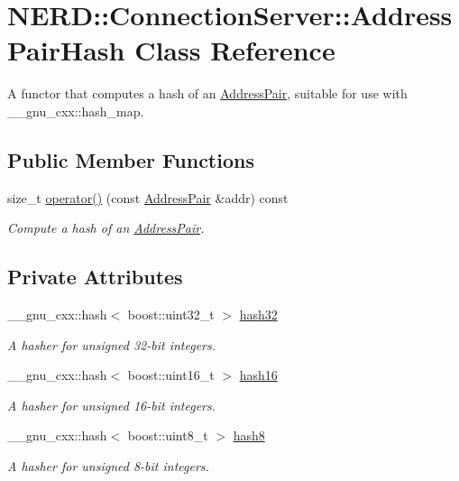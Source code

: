 \hypertarget{classNERD_1_1ConnectionServer_1_1AddressPairHash}{
\section{\-N\-E\-R\-D\-:\-:\-Connection\-Server\-:\-:\-Address\-Pair\-Hash \-Class \-Reference}
\label{classNERD_1_1ConnectionServer_1_1AddressPairHash}
}


\-A functor that computes a hash of an \hyperlink{structNERD_1_1ConnectionServer_1_1AddressPair}{\-Address\-Pair}, suitable for use with \-\_\-\-\_\-gnu\-\_\-cxx\-::hash\-\_\-map.  


\subsection*{\-Public \-Member \-Functions}
\begin{DoxyCompactItemize}
\item 
size\-\_\-t \hyperlink{classNERD_1_1ConnectionServer_1_1AddressPairHash_a36bbb841fe3f2cbacb4cab2687675c4d}{operator()} (const \hyperlink{structNERD_1_1ConnectionServer_1_1AddressPair}{\-Address\-Pair} \&addr) const 
\begin{DoxyCompactList}\small\item\em \-Compute a hash of an \hyperlink{structNERD_1_1ConnectionServer_1_1AddressPair}{\-Address\-Pair}. \end{DoxyCompactList}\end{DoxyCompactItemize}
\subsection*{\-Private \-Attributes}
\begin{DoxyCompactItemize}
\item 
\-\_\-\-\_\-gnu\-\_\-cxx\-::hash$<$ boost\-::uint32\-\_\-t $>$ \hyperlink{classNERD_1_1ConnectionServer_1_1AddressPairHash_aa97511d9c6987cd101fb7f201f8e660a}{hash32}
\begin{DoxyCompactList}\small\item\em \-A hasher for unsigned 32-\/bit integers. \end{DoxyCompactList}\item 
\-\_\-\-\_\-gnu\-\_\-cxx\-::hash$<$ boost\-::uint16\-\_\-t $>$ \hyperlink{classNERD_1_1ConnectionServer_1_1AddressPairHash_aada49946f39b27b07f36934b5e1d5ac6}{hash16}
\begin{DoxyCompactList}\small\item\em \-A hasher for unsigned 16-\/bit integers. \end{DoxyCompactList}\item 
\-\_\-\-\_\-gnu\-\_\-cxx\-::hash$<$ boost\-::uint8\-\_\-t $>$ \hyperlink{classNERD_1_1ConnectionServer_1_1AddressPairHash_aa5cd9f0aee285e5abf215216e031391a}{hash8}
\begin{DoxyCompactList}\small\item\em \-A hasher for unsigned 8-\/bit integers. \end{DoxyCompactList}\end{DoxyCompactItemize}


